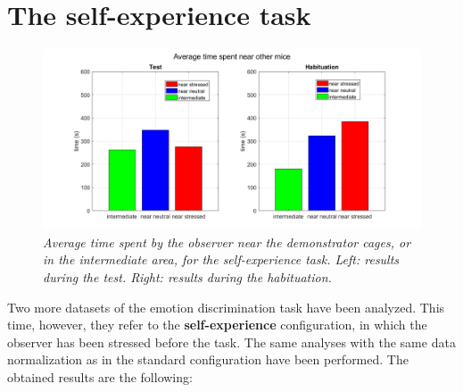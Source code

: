 \documentclass[12pt, a4paper]{report}
\begin{document}
\section{The self-experience task}


\begin{figure}[H]
	
	\begin{center}
		\hspace*{-1.4cm}
		\includegraphics[scale=.5]{times_self.png} 
	\end{center} 
	\caption{\textit{Average time spent by the observer near the demonstrator cages, or in the intermediate area, for the self-experience task. Left: results during the test. Right: results during the habituation.}}
	\label{times_self}
\end{figure}


Two more datasets of the emotion discrimination task have been analyzed. This time, however, they refer to the \textbf{self-experience} configuration, in which the observer has been stressed before the task. The same analyses with the same data normalization as in the standard configuration have been performed. The obtained results are the following:
\end{document}
